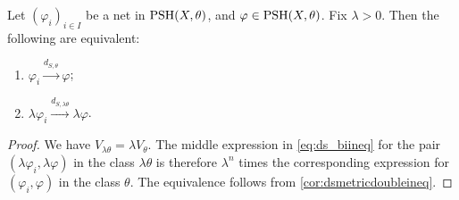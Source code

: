 \begin{lemma}\label{lma:dS_res}
    Let $(\varphi_i)_{i\in I}$ be a net in $\mathrm{PSH}(X,\theta)$, and $\varphi\in \mathrm{PSH}(X,\theta)$. Fix $\lambda>0$. Then the following are equivalent:
    \begin{enumerate}
        \item\label{itm:lma:dS_res:1} $\varphi_i\xrightarrow{d_{S,\theta}}\varphi$;
        \item\label{itm:lma:dS_res:2} $\lambda\varphi_i\xrightarrow{d_{S,\lambda\theta}}\lambda\varphi$.
    \end{enumerate}
\end{lemma}
\begin{proof}
    We have $V_{\lambda\theta}=\lambda V_{\theta}$. The middle expression in \eqref{eq:ds_biineq} for the pair $(\lambda\varphi_i,\lambda\varphi)$ in the class $\lambda\theta$ is therefore $\lambda^n$ times the corresponding expression for $(\varphi_i,\varphi)$ in the class $\theta$. The equivalence follows from \cref{cor:dsmetricdoubleineq}.
\end{proof}



